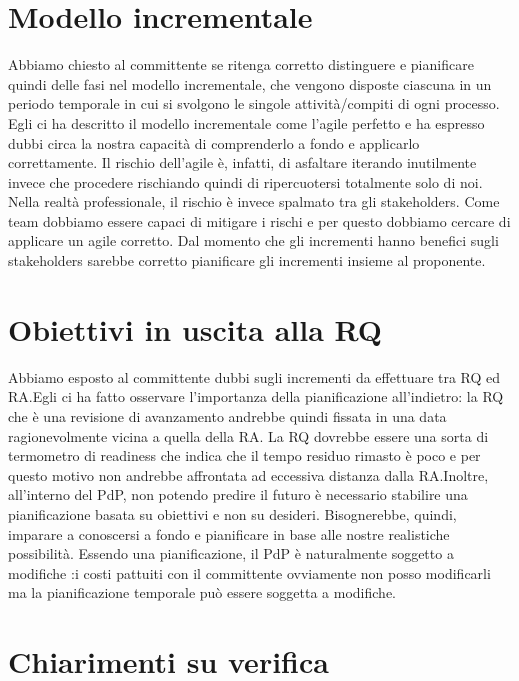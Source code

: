 \documentclass{article}
\begin{document}
\section{Modello incrementale}%
\label{sec:modello_incrementale}

Abbiamo chiesto al committente se ritenga corretto distinguere e pianificare quindi delle fasi nel modello incrementale, che vengono disposte ciascuna in un periodo temporale in cui si svolgono le singole attività/compiti di ogni processo. Egli ci ha descritto il modello incrementale come l'agile perfetto e ha espresso dubbi circa la nostra capacità di comprenderlo a fondo e applicarlo correttamente. Il rischio dell'agile è, infatti, di asfaltare iterando inutilmente invece che procedere rischiando quindi di ripercuotersi totalmente solo di noi. Nella realtà professionale, il rischio è invece spalmato tra gli stakeholders. Come team dobbiamo essere capaci di mitigare i rischi e per questo dobbiamo cercare di applicare un agile corretto. Dal momento che gli incrementi hanno benefici sugli stakeholders sarebbe corretto pianificare gli incrementi insieme al proponente.

\section{Obiettivi in uscita alla RQ}%
\label{sec:obiettivi_in_uscita_alla_RQ}
Abbiamo esposto al committente dubbi sugli incrementi da effettuare tra RQ ed RA.Egli ci ha fatto osservare l'importanza della pianificazione all'indietro: la RQ che è una revisione di avanzamento andrebbe quindi fissata in una data ragionevolmente vicina a quella della RA\@. La RQ dovrebbe essere una sorta di termometro di readiness che indica che il tempo residuo rimasto è poco e per questo motivo non andrebbe affrontata ad eccessiva distanza dalla RA.Inoltre, all'interno del PdP, non potendo predire il futuro è necessario stabilire una pianificazione basata su obiettivi e non su desideri. Bisognerebbe, quindi, imparare a conoscersi a fondo e pianificare in base alle nostre realistiche possibilità. Essendo una pianificazione, il PdP è naturalmente soggetto a modifiche :i costi pattuiti con il committente ovviamente non posso modificarli ma la pianificazione temporale può essere soggetta a modifiche. %

\section{Chiarimenti su verifica}%
\label{sec:chiarimenti_su_verifica}
\end{document}
